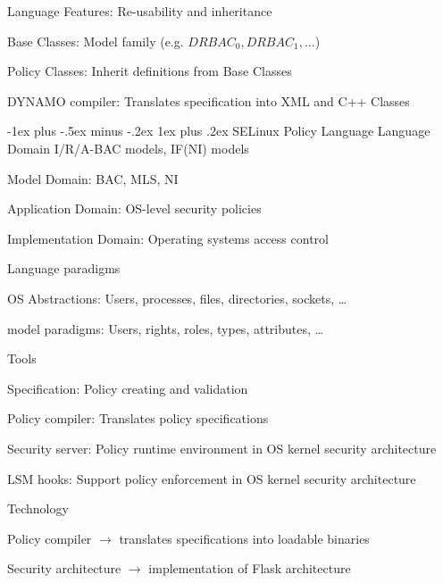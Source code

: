 \documentclass[a4paper]{article}
\makeatletter
\renewcommand{\subsubsection}{\@startsection{subsubsection}{3}{0mm}%
                {-1ex plus -.5ex minus -.2ex}%
                {1ex plus .2ex}%
                {\normalfont\small\bfseries}}
\makeatother
\begin{document}
\begin{multicols}{3}
    Language Features: Re-usability and inheritance
    \begin{itemize*}
        \item Base Classes: Model family (e.g. $DRBAC_0 , DRBAC_1 , \dots $)
        \item Policy Classes: Inherit definitions from Base Classes
    \end{itemize*}

    DYNAMO compiler: Translates specification into XML and C++ Classes

    \subsubsection{SELinux Policy Language}
    Language Domain I/R/A-BAC models, IF(NI) models

    Model Domain: BAC, MLS, NI

    Application Domain: OS-level security policies

    Implementation Domain: Operating systems access control

    Language paradigms
    \begin{itemize*}
        \item OS Abstractions: Users, processes, files, directories, sockets, \dots
        \item model paradigms: Users, rights, roles, types, attributes, \dots
    \end{itemize*}

    Tools
    \begin{itemize*}
        \item Specification: Policy creating and validation
        \item Policy compiler: Translates policy specifications
        \item Security server: Policy runtime environment in OS kernel security architecture
        \item LSM hooks: Support policy enforcement in OS kernel security architecture
    \end{itemize*}

    Technology
    \begin{itemize*}
        \item Policy compiler $\rightarrow$ translates specifications into loadable binaries
        \item Security architecture $\rightarrow$ implementation of Flask architecture
    \end{itemize*}


\end{multicols}
\end{document}
